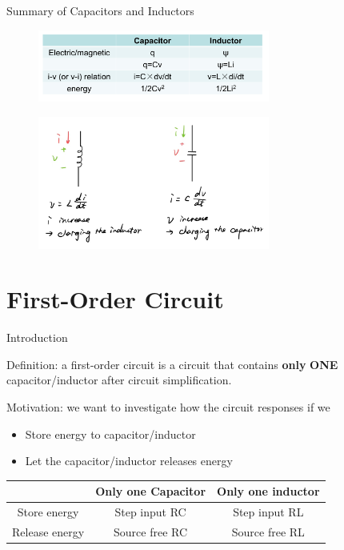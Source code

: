 \documentclass{beamer}
\begin{document}
    \begin{frame}{Summary of Capacitors and Inductors}
        \begin{figure}
        \centering
        \includegraphics[width=3in]{ycy/Chap6/f8.jpg}
        \end{figure}
        \begin{figure}
        \centering
        \includegraphics[width=3in]{ycy/Chap6/f9.jpg}
        \end{figure}
    \end{frame}

\section{First-Order Circuit}

\begin{frame}{Introduction}

Definition: a first-order circuit is a circuit that contains \textbf{only} \textbf{ONE} capacitor/inductor after circuit simplification.

Motivation: we want to investigate how the circuit responses if we
    \begin{itemize}
        \item Store energy to capacitor/inductor
        \item Let the capacitor/inductor releases energy
    \end{itemize}

\begin{table}[]
    \centering
    \begin{tabular}{c|cc}
        \hline
        & Only one Capacitor & Only one inductor \\
        \hline
        Store energy &Step input RC& Step input RL \\
        Release energy &Source free RC& Source free RL\\
         \hline
    \end{tabular}
\end{table}


\end{frame}
\end{document}

